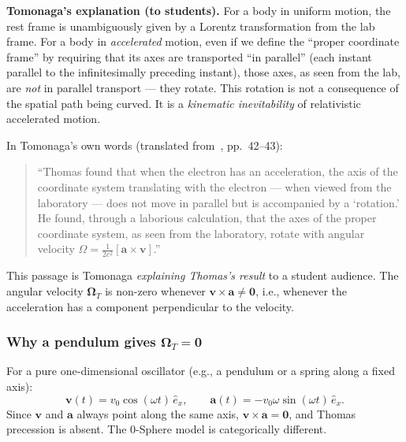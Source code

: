 \documentclass[12pt,letterpaper]{article}
\begin{document}
\begin{mdframed}[style=bluebox]
\textbf{Tomonaga's explanation (to students).}
For a body in uniform motion, the rest frame is unambiguously given by a Lorentz
transformation from the lab frame.  For a body in \emph{accelerated} motion,
even if we define the ``proper coordinate frame'' by requiring that its axes are
transported ``in parallel'' (each instant parallel to the infinitesimally preceding
instant), those axes, as seen from the lab, are \emph{not} in parallel transport
--- they rotate.
This rotation is not a consequence of the spatial path being curved.
It is a \emph{kinematic inevitability} of relativistic accelerated motion.
\end{mdframed}

In Tomonaga's own words (translated from~\cite{Tomonaga1997}, pp.~42--43):

\begin{quote}
``Thomas found that when the electron has an acceleration, the axis of the
coordinate system translating with the electron --- when viewed from the laboratory ---
does not move in parallel but is accompanied by a `rotation.' He found, through a
laborious calculation, that the axes of the proper coordinate system, as seen from
the laboratory, rotate with angular velocity
$\Omega = \frac{1}{2c^2}[\mathbf{a}\times\mathbf{v}]$.''
\end{quote}

This passage is Tomonaga \emph{explaining Thomas's result} to a student audience.
The angular velocity $\boldsymbol{\Omega}_T$ is non-zero whenever
$\mathbf{v}\times\mathbf{a}\neq\mathbf{0}$, i.e., whenever the acceleration has
a component perpendicular to the velocity.

\subsubsection{\texorpdfstring{Why a pendulum gives $\boldsymbol{\Omega}_T = \mathbf{0}$}{Why a pendulum gives Omega\_T = 0}}

For a pure one-dimensional oscillator (e.g., a pendulum or a spring along a fixed axis):
\begin{equation}
\mathbf{v}(t) = v_0\cos(\omega t)\,\hat{e}_x, \qquad
\mathbf{a}(t) = -v_0\omega\sin(\omega t)\,\hat{e}_x.
\end{equation}
Since $\mathbf{v}$ and $\mathbf{a}$ always point along the same axis,
$\mathbf{v}\times\mathbf{a} = \mathbf{0}$, and Thomas precession is absent.
The 0-Sphere model is categorically different.
\end{document}
